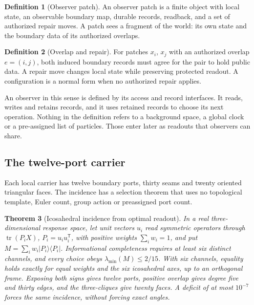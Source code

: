 \documentclass[11pt]{article}
\newtheorem{theorem}{Theorem}[section]
\theoremstyle{definition}
\newtheorem{definition}[theorem]{Definition}
\theoremstyle{remark}
\begin{document}
\begin{definition}[Observer patch]
An observer patch is a finite object with local state, an observable boundary
map, durable records, readback, and a set of authorized repair moves. A
patch sees a fragment of the world: its own state and the boundary data of
its authorized overlaps.
\end{definition}

\begin{definition}[Overlap and repair]
For patches $x_i$, $x_j$ with an authorized overlap $e=(i,j)$, both induced
boundary records must agree for the pair to hold public data. A repair move
changes local state while preserving protected readout. A configuration is a
normal form when no authorized repair applies.
\end{definition}

An observer in this sense is defined by its access and record interfaces.
It reads, writes and retains records, and it uses retained records to choose
its next operation. Nothing in the definition refers to a background space,
a global clock or a pre-assigned list of particles. Those enter later as
readouts that observers can share.

\subsection{The twelve-port carrier}

Each local carrier has twelve boundary ports, thirty seams and twenty
oriented triangular faces. The incidence has a selection theorem that uses no
topological template, Euler count, group action or preassigned port count.

\begin{theorem}[Icosahedral incidence from optimal readout]
\label{thm:carrier-selector}
In a real three-dimensional response space, let unit vectors $u_i$ read symmetric
operators through $\operatorname{tr}(P_iX)$, $P_i=u_iu_i^{\mathsf T}$, with positive
weights $\sum_iw_i=1$, and put $M=\sum_iw_i|P_i\rangle\langle P_i|$. Informational
completeness requires at least six distinct channels, and every choice obeys
$\lambda_{\min}(M)\leq2/15$. With six channels, equality holds exactly for equal weights
and the six icosahedral axes, up to an orthogonal frame. Exposing both signs gives twelve
ports, positive overlap gives degree five and thirty edges, and the three-cliques give
twenty faces. A deficit of at most $10^{-7}$ forces the same incidence, without forcing
exact angles.
\end{theorem}
\end{document}
